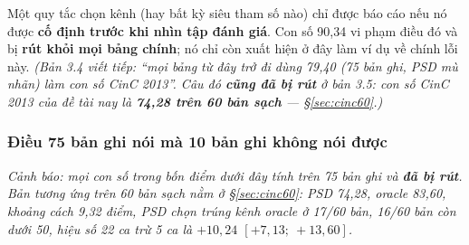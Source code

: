 \begin{ghichu}[title={Quy tắc nhóm tự đặt cho mọi kết quả về sau}]
Một quy tắc chọn kênh (hay bất kỳ siêu tham số nào) chỉ được báo cáo nếu nó được \textbf{cố định trước
khi nhìn tập đánh giá}. Con số 90,34 vi phạm điều đó và bị \textbf{rút khỏi mọi bảng chính}; nó chỉ còn
xuất hiện ở đây làm ví dụ về chính lỗi này. \textit{(Bản 3.4 viết tiếp: ``mọi bảng từ đây trở đi dùng
79,40 (75 bản ghi, PSD mù nhãn) làm con số CinC 2013''. Câu đó \textbf{cũng đã bị rút} ở bản 3.5: con
số CinC 2013 của đề tài nay là \textbf{74,28 trên 60 bản sạch} --- \S\ref{sec:cinc60}.)}
\end{ghichu}

\subsubsection{Điều 75 bản ghi nói mà 10 bản ghi không nói được \textnormal{}}

\textit{Cảnh báo: mọi con số trong bốn điểm dưới đây tính trên 75 bản ghi và \textbf{đã bị rút}. Bản
tương ứng trên 60 bản sạch nằm ở \S\ref{sec:cinc60}: PSD 74,28, oracle 83,60, khoảng cách 9,32 điểm,
PSD chọn trúng kênh oracle ở 17/60 bản, 16/60 bản còn dưới 50, hiệu số 22 ca trừ 5 ca là $+10{,}24$
$[+7{,}13;\ +13{,}60]$.}

